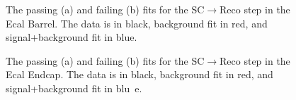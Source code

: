 \begin{thebibliography}{10}
\begin{figure}[htb]
  \begin{center}
    \caption{The passing (a) and failing (b) fits for the SC$\to$Reco step in the Ecal Barrel.
             The data is in black, background fit in red, and signal+background fit in blue.}
  \end{center}
\end{figure}

\begin{figure}[htb]
  \begin{center}
    \caption{The passing (a) and failing (b) fits for the SC$\to$Reco step in the Ecal Endcap.  
             The data is in black, background fit in red, and signal+background fit in blu\
e.}
  \end{center}
\end{figure}


\end{thebibliography}
